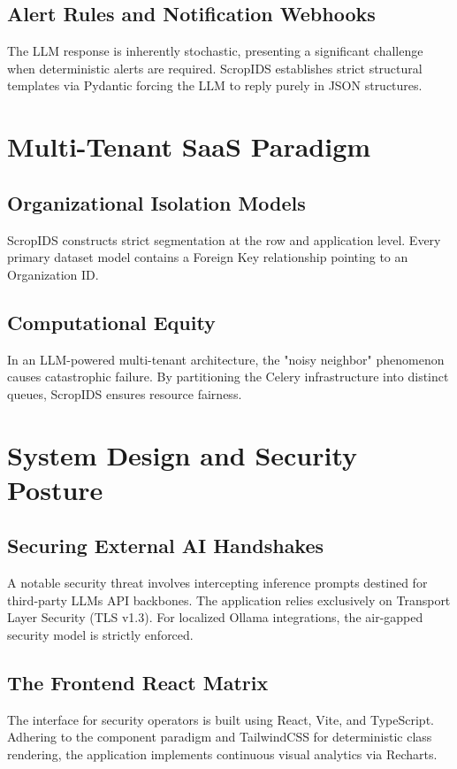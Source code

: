 \documentclass[10pt, conference]{IEEEtran}
\begin{document}
\subsection{Alert Rules and Notification Webhooks}
The LLM response is inherently stochastic, presenting a significant challenge when deterministic alerts are required. ScropIDS establishes strict structural templates via Pydantic forcing the LLM to reply purely in JSON structures.

\section{Multi-Tenant SaaS Paradigm}

\subsection{Organizational Isolation Models}
ScropIDS constructs strict segmentation at the row and application level. Every primary dataset model contains a Foreign Key relationship pointing to an Organization ID.

\subsection{Computational Equity}
In an LLM-powered multi-tenant architecture, the "noisy neighbor" phenomenon causes catastrophic failure. By partitioning the Celery infrastructure into distinct queues, ScropIDS ensures resource fairness.

\section{System Design and Security Posture}

\subsection{Securing External AI Handshakes}
A notable security threat involves intercepting inference prompts destined for third-party LLMs API backbones. The application relies exclusively on Transport Layer Security (TLS v1.3). For localized Ollama integrations, the air-gapped security model is strictly enforced.

\subsection{The Frontend React Matrix}
The interface for security operators is built using React, Vite, and TypeScript. Adhering to the component paradigm and TailwindCSS for deterministic class rendering, the application implements continuous visual analytics via Recharts.
\end{document}
